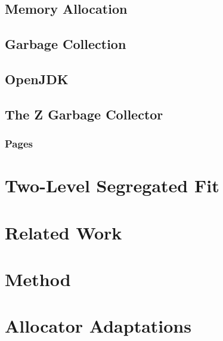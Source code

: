 \documentclass[a4paper,12pt]{article}
\begin{document}
\subsection{Memory Allocation}
\label{sec:memory_allocation}


\subsection{Garbage Collection}
\label{sec:gc}


\subsection{OpenJDK}
\label{sec:openjdk}


\subsection{The Z Garbage Collector}
\label{sec:zgc}


\subsubsection{Pages}
\label{sec:zpage}


\section{Two-Level Segregated Fit}
\label{sec:tlsf}


\newpage

\section{Related Work}
\label{sec:related-work}


\newpage

\section{Method}
\label{sec:method}


\newpage

\section{Allocator Adaptations}
\label{sec:adaptations}


\newpage
\end{document}
